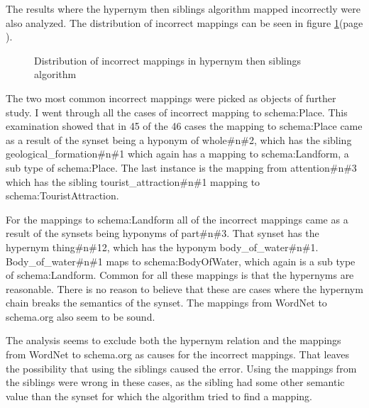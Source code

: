The results where the hypernym then siblings algorithm mapped incorrectly were also analyzed.
The distribution of incorrect mappings can be seen in figure \ref{fig:incorrect}(page \pageref{fig:incorrect}).

\begin{figure}[ht]
	\centering
	\caption{Distribution of incorrect mappings in hypernym then siblings algorithm}
	\label{fig:incorrect}
\end{figure}

The two most common incorrect mappings were picked as objects of further study.
I went through all the cases of incorrect mapping to schema:Place.
This examination showed that in 45 of the 46 cases the mapping to schema:Place came as a result of
the synset being a hyponym of whole\#n\#2, which has the sibling geological\_formation\#n\#1 which again has a mapping to
schema:Landform, a sub type of schema:Place.
The last instance is the mapping from attention\#n\#3 which has the sibling tourist\_attraction\#n\#1 mapping to
schema:TouristAttraction.

For the mappings to schema:Landform all of the incorrect mappings came as a result of the synsets being hyponyms of part\#n\#3.
That synset has the hypernym thing\#n\#12, which has the hyponym body\_of\_water\#n\#1.
Body\_of\_water\#n\#1 maps to schema:BodyOfWater, which again is a sub type of schema:Landform.
Common for all these mappings is that the hypernyms are reasonable.
There is no reason to believe that these are cases where the hypernym chain breaks the semantics of the synset.
The mappings from WordNet to schema.org also seem to be sound.

The analysis seems to exclude both the hypernym relation and the mappings from WordNet to schema.org as causes for the incorrect mappings.
That leaves the possibility that using the siblings caused the error.
Using the mappings from the siblings were wrong in these cases,
as the sibling had some other semantic value than the synset for which the algorithm tried to find a mapping.

